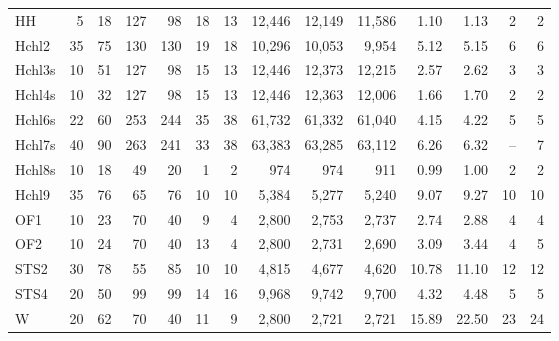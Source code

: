 \documentclass[9pt]{entcs}
\begin{document}
\begin{table}[ht]
\begin{tabular}{@{\extracolsep{4pt}}lrrrrrrrrrrrrr@{}}
HH & 5 & 18 & 127 & 98 & 18 & 13 & 12,446 & 12,149 & 11,586 & 1.10 & 1.13 & 2 & 2 \\
Hchl2 & 35 & 75 & 130 & 130 & 19 & 18 & 10,296 & 10,053 & 9,954 & 5.12 & 5.15 & 6 & 6 \\
Hchl3s & 10 & 51 & 127 & 98 & 15 & 13 & 12,446 & 12,373 & 12,215 & 2.57 & 2.62 & 3 & 3 \\
Hchl4s & 10 & 32 & 127 & 98 & 15 & 13 & 12,446 & 12,363 & 12,006 & 1.66 & 1.70 & 2 & 2 \\
Hchl6s & 22 & 60 & 253 & 244 & 35 & 38 & 61,732 & 61,332 & 61,040 & 4.15 & 4.22 & 5 & 5 \\
Hchl7s & 40 & 90 & 263 & 241 & 33 & 38 & 63,383 & 63,285 & 63,112 & 6.26 & 6.32 & -- & 7 \\
Hchl8s & 10 & 18 & 49 & 20 & 1 & 2 & 974 & 974 & 911 & 0.99 & 1.00 & 2 & 2 \\
Hchl9 & 35 & 76 & 65 & 76 & 10 & 10 & 5,384 & 5,277 & 5,240 & 9.07 & 9.27 & 10 & 10 \\
OF1 & 10 & 23 & 70 & 40 & 9 & 4 & 2,800 & 2,753 & 2,737 & 2.74 & 2.88 & 4 & 4 \\
OF2 & 10 & 24 & 70 & 40 & 13 & 4 & 2,800 & 2,731 & 2,690 & 3.09 & 3.44 & 4 & 5 \\
STS2 & 30 & 78 & 55 & 85 & 10 & 10 & 4,815 & 4,677 & 4,620 & 10.78 & 11.10 & 12 & 12 \\
STS4 & 20 & 50 & 99 & 99 & 14 & 16 & 9,968 & 9,742 & 9,700 & 4.32 & 4.48 & 5 & 5 \\
W & 20 & 62 & 70 & 40 & 11 & 9 & 2,800 & 2,721 & 2,721 & 15.89 & 22.50 & 23 & 24 \\\hline\hline
\end{tabular}
\label{tab:instances}
\end{table}

\end{document}
